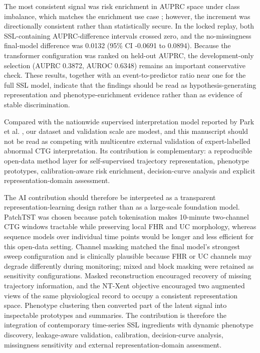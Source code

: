 \documentclass[utf8]{FrontiersinHarvard}
\begin{document}
The most consistent signal was risk enrichment in AUPRC space under class imbalance, which matches the enrichment use case \citep{davis2006}; however, the increment was directionally consistent rather than statistically secure. In the locked replay, both SSL-containing AUPRC-difference intervals crossed zero, and the no-missingness final-model difference was 0.0132 (95\% CI -0.0691 to 0.0894). Because the transformer configuration was ranked on held-out AUPRC, the development-only selection (AUPRC 0.3872, AUROC 0.6348) remains an important conservative check. These results, together with an event-to-predictor ratio near one for the full SSL model, indicate that the findings should be read as hypothesis-generating representation and phenotype-enrichment evidence rather than as evidence of stable discrimination.

Compared with the nationwide supervised interpretation model reported by Park et al. \citep{park2025nationwide}, our dataset and validation scale are modest, and this manuscript should not be read as competing with multicentre external validation of expert-labelled abnormal CTG interpretation. Its contribution is complementary: a reproducible open-data method layer for self-supervised trajectory representation, phenotype prototypes, calibration-aware risk enrichment, decision-curve analysis and explicit representation-domain assessment.

The AI contribution should therefore be interpreted as a transparent representation-learning design rather than as a large-scale foundation model. PatchTST was chosen because patch tokenisation makes 10-minute two-channel CTG windows tractable while preserving local FHR and UC morphology, whereas sequence models over individual time points would be longer and less efficient for this open-data setting. Channel masking matched the final model's strongest sweep configuration and is clinically plausible because FHR or UC channels may degrade differently during monitoring; mixed and block masking were retained as sensitivity configurations. Masked reconstruction encouraged recovery of missing trajectory information, and the NT-Xent objective encouraged two augmented views of the same physiological record to occupy a consistent representation space. Phenotype clustering then converted part of the latent signal into inspectable prototypes and summaries. The contribution is therefore the integration of contemporary time-series SSL ingredients with dynamic phenotype discovery, leakage-aware validation, calibration, decision-curve analysis, missingness sensitivity and external representation-domain assessment.
\end{document}
